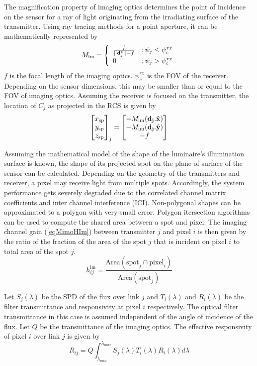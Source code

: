 The magnification property of imaging optics determines the point of incidence on the sensor for a ray of light originating from the irradiating surface of the transmitter. Using ray tracing methods for a point aperture, it can be mathematically represented by
\begin{equation}
	\label{eqOpMag}
	M_{\text{im}} = \left\{ \begin{array}{ll} \frac{f}{||{\bf{d}}_{j}^{z}||-f} &;  \psi_{j}\leq\psi_{c}^{rx} \\ 0 &;  \psi_{j}>\psi_{c}^{rx} \end{array} \right.
\end{equation}
$f$ is the focal length of the imaging optics. $\psi_{c}^{rx}$ is the FOV of the receiver. Depending on the sensor dimensions, this may be smaller than or equal to the FOV of imaging optics.
Assuming the receiver is focused on the transmitter, the location of $C_{j}$ as projected in the RCS is given by
\begin{equation}
	\label{eqLocSp}
	{ \left[ \begin{matrix} x_{\text{sp}}\\ y_{\text{sp}}\\ z_{\text{sp}} \end{matrix} \right] }_{j} = \left[ \begin{matrix} -M_{\text{im}}({\bf{d}_{j}}.{\hat{\bf{x}}})\\ -M_{\text{im}}({\bf{d}_{j}}.{\hat{\bf{y}})}\\ -f \end{matrix} \right]
	\end{equation}
	
Assuming the mathematical model of the shape of the luminaire's illumination surface is known, the shape of its projected spot on the plane of surface of the sensor can be calculated. Depending on the geometry of the transmitters and receiver, a pixel may receive light from multiple spots. Accordingly, the system performance gets severely degraded due to  the correlated channel matrix coefficients and inter channel interference (ICI). Non-polygonal shapes can be approximated to a polygon with very small error. Polygon itersection algorithms can be used to compute the shared area between a spot and pixel. The imaging channel gain (\ref{eqMimoHIm}) between transmitter $j$ and pixel $i$ is then given by the ratio of the fraction of the area of the spot $j$ that is incident on pixel $i$ to total area of the spot $j$.
\begin{equation}
	\label{eqMimoHIm}
	h^{\text{im}}_{ij} = \frac{\text{Area}(\text{spot}_{j}\cap \text{pixel}_{i})}{\text{Area}(\text{spot}_{j})}
\end{equation}

Let $S_{j}(\lambda)$ be the SPD of the flux over link $j$ and $T_{i}(\lambda)$ and $R_{i}(\lambda)$ be the filter transmittance and responsivity at pixel $i$ respectively. The optical filter transmittance in this case is assumed independent of the angle of incidence of the flux. Let $Q$ be the transmittance of the imaging optics. The effective responsivity of pixel $i$ over link $j$ is given by
\begin{equation} 
	\label{eqPxResp}
	R_{ij} = Q\int_{\lambda_{min}}^{\lambda_{max}}S_{j}(\lambda)T_{i}(\lambda)R_{i}(\lambda)d\lambda
\end{equation}

